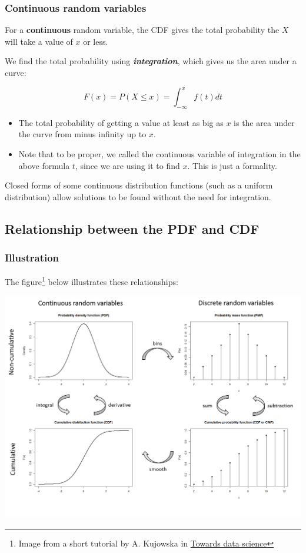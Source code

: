 \documentclass[
]{article}
\providecommand{\tightlist}{%
  \setlength{\itemsep}{0pt}\setlength{\parskip}{0pt}}
\begin{document}
\hypertarget{continuous-random-variables-1}{%
\subsubsection{Continuous random
variables}\label{continuous-random-variables-1}}

For a \textbf{continuous} random variable, the CDF gives the total
probability the \(X\) will take a value of \(x\) or less.

We find the total probability using \textbf{\emph{integration}}, which
gives us the area under a curve:

\[ F(x) = P(X \le x) = \int_{-\infty}^x f(t)dt\]

\begin{itemize}
\tightlist
\item
  The total probability of getting a value at least as big as \(x\) is
  the area under the curve from minus infinity up to \(x\).
\item
  Note that to be proper, we called the continuous variable of
  integration in the above formula \(t\), since we are using it to find
  \(x\). This is just a formality.
\end{itemize}

Closed forms of some continuous distribution functions (such as a
uniform distribution) allow solutions to be found without the need for
integration.

\hypertarget{relationship-between-the-pdf-and-cdf}{%
\subsection{Relationship between the PDF and
CDF}\label{relationship-between-the-pdf-and-cdf}}

\hypertarget{illustration}{%
\subsubsection{Illustration}\label{illustration}}

The figure\footnote{Image from a short tutorial by A. Kujowska in
  \href{https://towardsdatascience.com/quantiles-key-to-probability-distributions-ce1786d479a9}{Towards
  data science}} below illustrates these relationships:

\includegraphics{Images/pdf_cdf_relations.png}
\end{document}
